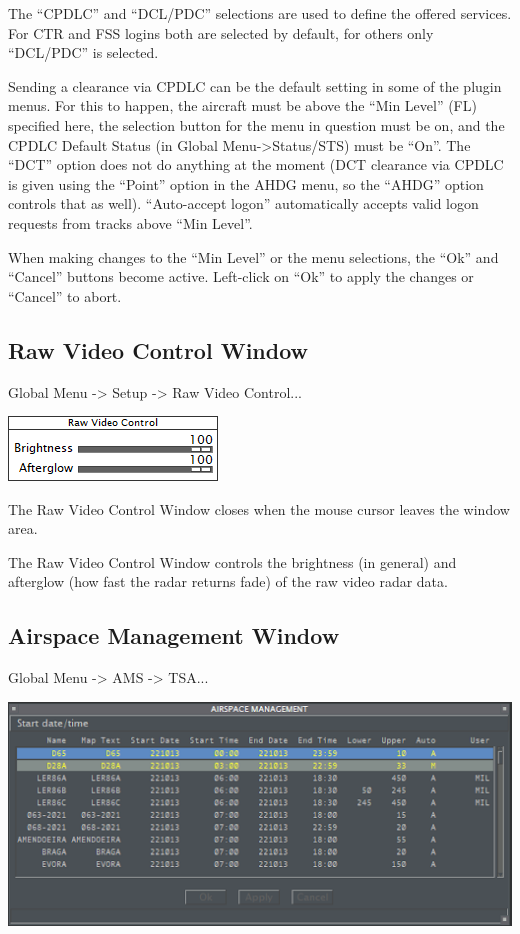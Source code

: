 \documentclass[11pt,a4paper,oldfontcommands]{memoir}
\begin{document}
The “CPDLC” and “DCL/PDC” selections are used to define the offered services. For CTR and FSS logins both are selected by default, for others only “DCL/PDC” is selected.

Sending a clearance via CPDLC can be the default setting in some of the plugin menus. For this to happen, the aircraft must be above the “Min Level” (FL) specified here, the selection button for the menu in question must be on, and the CPDLC Default Status (in Global Menu->Status/STS) must be “On”. The “DCT” option does not do anything at the moment (DCT clearance via CPDLC is given using the “Point” option in the AHDG menu, so the “AHDG” option controls that as well). “Auto-accept logon” automatically accepts valid logon requests from tracks above “Min Level”.

When making changes to the “Min Level” or the menu selections, the “Ok” and “Cancel” buttons become active. Left-click on “Ok” to apply the changes or “Cancel” to abort.

\subsection{Raw Video Control Window}
\label{win:rvcw}

Global Menu -> Setup -> Raw Video Control...

\includegraphics{img/rawvideo.png}

The Raw Video Control Window closes when the mouse cursor leaves the window area.

The Raw Video Control Window controls the brightness (in general) and afterglow (how fast the radar returns fade) of the raw video radar data.

\subsection{Airspace Management Window}
\label{win:amw}

Global Menu -> AMS -> TSA...

\includegraphics{img/tsa.png}
\end{document}
